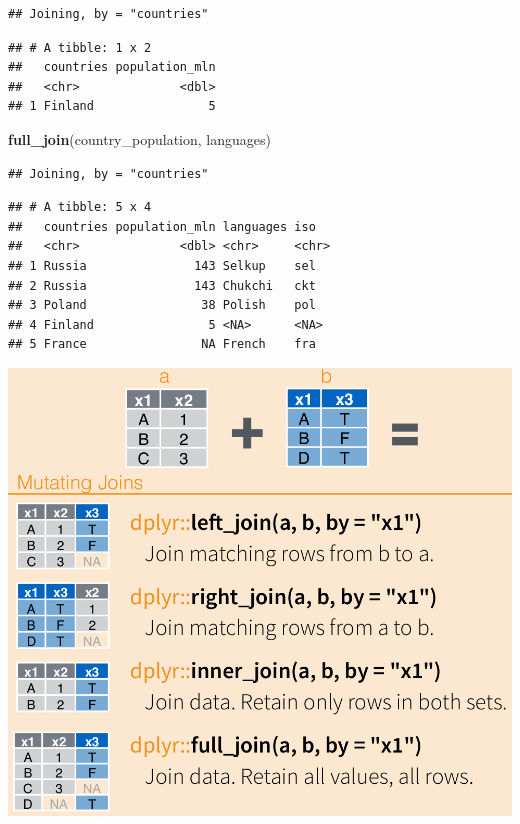 \documentclass[
]{book}
\newenvironment{Shaded}{\begin{snugshade}}{\end{snugshade}}
\newcommand{\KeywordTok}[1]{\textcolor[rgb]{0.13,0.29,0.53}{\textbf{#1}}}
\newcommand{\NormalTok}[1]{#1}
\begin{document}
\begin{verbatim}
## Joining, by = "countries"
\end{verbatim}

\begin{verbatim}
## # A tibble: 1 x 2
##   countries population_mln
##   <chr>              <dbl>
## 1 Finland                5
\end{verbatim}

\begin{Shaded}
\begin{Highlighting}[]
\KeywordTok{full_join}\NormalTok{(country_population, languages)}
\end{Highlighting}
\end{Shaded}

\begin{verbatim}
## Joining, by = "countries"
\end{verbatim}

\begin{verbatim}
## # A tibble: 5 x 4
##   countries population_mln languages iso  
##   <chr>              <dbl> <chr>     <chr>
## 1 Russia               143 Selkup    sel  
## 2 Russia               143 Chukchi   ckt  
## 3 Poland                38 Polish    pol  
## 4 Finland                5 <NA>      <NA> 
## 5 France                NA French    fra
\end{verbatim}

\includegraphics{images/02.07.joins.png}
\end{document}
